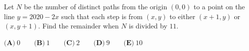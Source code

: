 Let $N$ be the number of distinct paths from the origin $(0,0)$ to a point on the line $y=2020-2x$ such that each step is from $(x,y)$ to either $(x+1,y)$ or $(x,y+1)$. Find the remainder when $N$ is divided by $11$.

$\textbf{(A)}\ 0\qquad\textbf{(B)}\ 1\qquad\textbf{(C)}\ 2\qquad\textbf{(D)}\ 9\qquad\textbf{(E)}\ 10$
